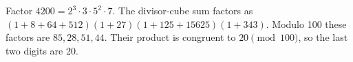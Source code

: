 Factor $4200=2^3\cdot3\cdot5^2\cdot7$. The divisor-cube sum factors as $(1+8+64+512)(1+27)(1+125+15625)(1+343)$. Modulo 100 these factors are $85,28,51,44$. Their product is congruent to $\boxed{20}\pmod{100}$, so the last two digits are 20.
